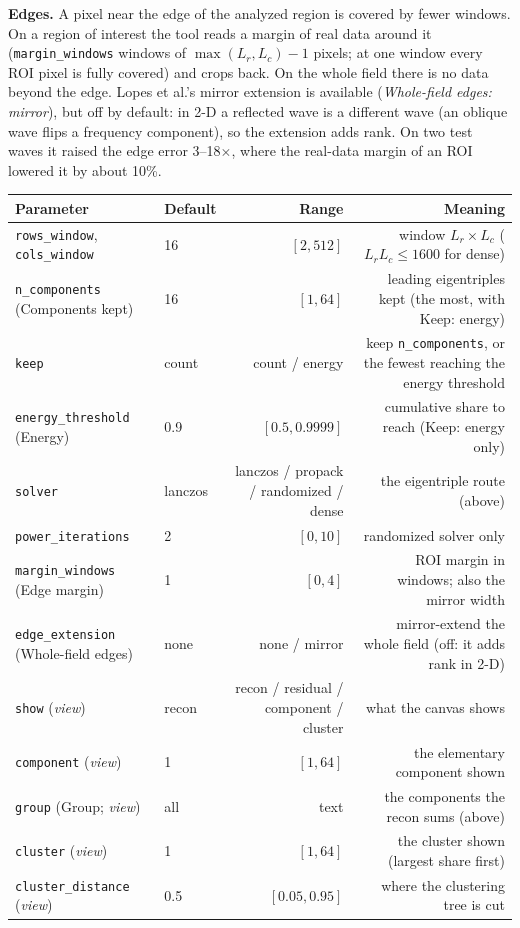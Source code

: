 \documentclass[10pt]{article}
\begin{document}
\textbf{Edges.} A pixel near the edge of the analyzed region is covered by fewer windows. On a
region of interest the tool reads a margin of real data around it (\texttt{margin\_windows}
windows of $\max(L_r,L_c)-1$ pixels; at one window every ROI pixel is fully covered) and crops
back. On the whole field there is no data beyond the edge. Lopes et al.'s mirror extension is
available (\emph{Whole-field edges: mirror}), but off by default: in 2-D a reflected wave is a
different wave (an oblique wave flips a frequency component), so the extension adds rank. On two
test waves it raised the edge error 3--18$\times$, where the real-data margin of an ROI lowered
it by about 10\%.

\begin{longtable}{P l R N}
\toprule Parameter & Default & Range & Meaning \\ \midrule
\texttt{rows\_window}, \texttt{cols\_window} & 16 & $[2,512]$ & window $L_r\times L_c$ ($L_rL_c\le1600$ for dense) \\
\texttt{n\_components} (Components kept) & 16 & $[1,64]$ & leading eigentriples kept (the most, with Keep: energy) \\
\texttt{keep} & count & count / energy & keep \texttt{n\_components}, or the fewest reaching the energy threshold \\
\texttt{energy\_threshold} (Energy) & 0.9 & $[0.5,0.9999]$ & cumulative share to reach (Keep: energy only) \\
\texttt{solver} & lanczos & lanczos / propack / randomized / dense & the eigentriple route (above) \\
\texttt{power\_iterations} & 2 & $[0,10]$ & randomized solver only \\
\texttt{margin\_windows} (Edge margin) & 1 & $[0,4]$ & ROI margin in windows; also the mirror width \\
\texttt{edge\_extension} (Whole-field edges) & none & none / mirror & mirror-extend the whole field (off: it adds rank in 2-D) \\
\texttt{show} (\emph{view}) & recon & recon / residual / component / cluster & what the canvas shows \\
\texttt{component} (\emph{view}) & 1 & $[1,64]$ & the elementary component shown \\
\texttt{group} (Group; \emph{view}) & all & text & the components the recon sums (above) \\
\texttt{cluster} (\emph{view}) & 1 & $[1,64]$ & the cluster shown (largest share first) \\
\texttt{cluster\_distance} (\emph{view}) & 0.5 & $[0.05,0.95]$ & where the clustering tree is cut \\
\bottomrule
\end{longtable}
\end{document}
